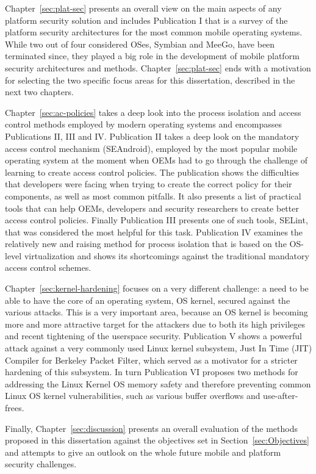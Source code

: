 Chapter~\ref{sec:plat-sec} presents an overall view on the main aspects of any platform security solution and includes Publication I that is a survey of the platform security architectures for the most common mobile operating systems. While two out of four considered OSes, Symbian and MeeGo, have been terminated since, they played a big role in the development of mobile platform security architectures and methods. Chapter~\ref{sec:plat-sec} ends with a motivation for selecting the two specific focus areas for this dissertation, described in the next two chapters. 

Chapter~\ref{sec:ac-policies} takes a deep look into the process isolation and access control methods employed by modern operating systems and encompasses Publications II, III and IV. Publication II takes a deep look on the mandatory access control mechanism (SEAndroid), employed by the most popular mobile operating system at the moment when OEMs had to go through the challenge of learning to create access control policies. The publication shows the difficulties that developers were facing when trying to create the correct policy for their components, as well as most common pitfalls. It also presents a list of practical tools that can help OEMs, developers and security researchers to create better access control policies. Finally Publication III presents one of such tools, SELint, that was considered the most helpful for this task. Publication IV examines the relatively new and raising method for process isolation that is based on the OS-level virtualization and shows its shortcomings against the traditional mandatory access control schemes.

Chapter~\ref{sec:kernel-hardening} focuses on a very different challenge: a need to be able to have the core of an operating system, OS kernel, secured against the various attacks. This is a very important area, because an OS kernel is becoming more and more attractive target for the attackers due to both its high privileges and recent tightening of the userspace security. Publication V shows a powerful attack against a very commonly used Linux kernel subsystem, Just In Time (JIT) Compiler for Berkeley Packet Filter, which served as a motivator for a stricter hardening of this subsystem. In turn Publication VI proposes two methods for addressing the Linux Kernel OS memory safety and therefore preventing common Linux OS kernel vulnerabilities, such as various buffer overflows and use-after-frees. 

Finally, Chapter~\ref{sec:discussion} presents an overall evaluation of the methods proposed in this dissertation against the objectives set in Section~\ref{sec:Objectives} and attempts to give an outlook on the whole future mobile and platform security challenges. 

